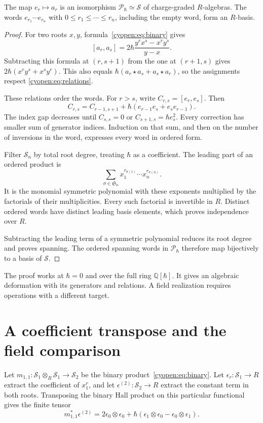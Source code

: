 \begin{theorem}
\label{cyopen:thm:presentation}
The map $e_r\mapsto a_r$ is an isomorphism
$\mathcal P_\hbar\simeq\mathcal S$ of charge-graded $R$-algebras.
The words $e_{r_1}\cdots e_{r_n}$ with
$0\leq r_1\leq\cdots\leq r_n$, including the empty word,
form an $R$-basis.
\end{theorem}
\begin{proof}
For two roots $x,y$, formula~\eqref{cyopen:eq:binary} gives
\[
 [a_r,a_s]=2\hbar\frac{y^rx^s-x^ry^s}{y-x}.
\]
Subtracting this formula at $(r,s+1)$ from the one at $(r+1,s)$
gives $2\hbar(x^ry^s+x^sy^r)$.
This also equals $\hbar(a_r\star a_s+a_s\star a_r)$,
so the assignments respect \eqref{cyopen:eq:relations}.

These relations order the words. For $r>s$, write
$C_{r,s}=[e_r,e_s]$. Then
\[
 C_{r,s}=C_{r-1,s+1}
       +\hbar(e_{r-1}e_s+e_se_{r-1}).
\]
The index gap decreases until
$C_{s,s}=0$ or $C_{s+1,s}=\hbar e_s^2$.
Every correction has smaller sum of generator indices.
Induction on that sum, and then on the number of inversions in
the word, expresses every word in ordered form.

Filter $\mathcal S_n$ by total root degree, treating $\hbar$
as a coefficient. The leading part of an ordered product is
\[
 \sum_{\sigma\in\mathfrak S_n}
 x_1^{r_{\sigma(1)}}\cdots x_n^{r_{\sigma(n)}}.
\]
It is the monomial symmetric polynomial with these exponents
multiplied by the factorials of their multiplicities.
Every such factorial is invertible in $R$.
Distinct ordered words have distinct leading basis elements,
which proves independence over $R$.

Subtracting the leading term of a symmetric polynomial reduces
its root degree and proves spanning. The ordered spanning words
in $\mathcal P_\hbar$ therefore map bijectively to a basis of
$\mathcal S$.
\end{proof}

The proof works at $\hbar=0$ and over the full ring $\mathbb Q[\hbar]$.
It gives an algebraic deformation with its generators and relations.
A field realization requires operations with a different target.

\section{A coefficient transpose and the field comparison}

Let $m_{1,1}:\mathcal S_1\otimes_R\mathcal S_1\to\mathcal S_2$
be the binary product~\eqref{cyopen:eq:binary}.
Let $\epsilon_r:\mathcal S_1\to R$ extract the coefficient of
$x_1^r$, and let $\epsilon^{(2)}:\mathcal S_2\to R$ extract the
constant term in both roots. Transposing the binary Hall product
on this particular functional gives the finite tensor
\begin{equation}\label{cyopen:eq:dual-binary}
 m_{1,1}^*\epsilon^{(2)}
 =2\epsilon_0\otimes\epsilon_0
  +\hbar(\epsilon_1\otimes\epsilon_0-
                   \epsilon_0\otimes\epsilon_1).
\end{equation}

